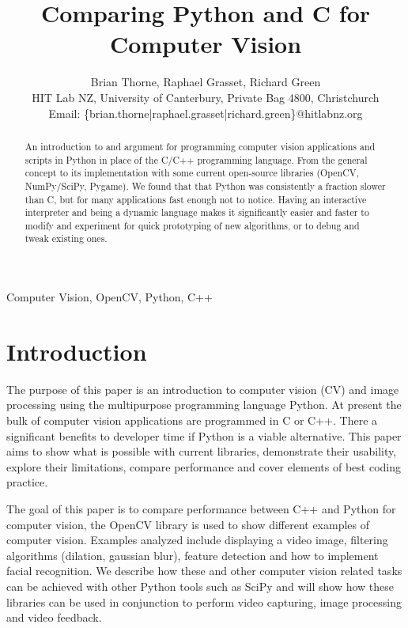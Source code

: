 \documentclass[english]{IEEEtran}
\theoremstyle{plain}
\begin{document}
\title{Comparing Python and C for Computer Vision}


\author{Brian Thorne, Raphael Grasset, Richard Green\\
HIT Lab NZ, University of Canterbury, Private Bag 4800, Christchurch\\
Email: \{brian.thorne|raphael.grasset|richard.green\}@hitlabnz.org}
\maketitle
\begin{abstract}
An introduction to and argument for programming computer vision applications
and scripts in Python in place of the C/C++ programming language.
From the general concept to its implementation with some current open-source
libraries (OpenCV, NumPy/SciPy, Pygame). We found that that Python
was consistently a fraction slower than C, but for many applications
fast enough not to notice. Having an interactive interpreter and being
a dynamic language makes it significantly easier and faster to modify
and experiment for quick prototyping of new algorithms, or to debug
and tweak existing ones.\end{abstract}
\begin{keywords}
Computer Vision, OpenCV, Python, C++
\end{keywords}

\section{Introduction}

The purpose of this paper is an introduction to computer vision (CV)
and image processing using the multipurpose programming language Python.
At present the bulk of computer vision applications are programmed
in C or C++. There a significant benefits to developer time if Python
is a viable alternative. This paper aims to show what is possible
with current libraries, demonstrate their usability, explore their
limitations, compare performance and cover elements of best coding
practice.

The goal of this paper is to compare performance between C++ and Python
for computer vision, the OpenCV library is used to show different
examples of computer vision. Examples analyzed include displaying
a video image, filtering algorithms (dilation, gaussian blur), feature
detection and how to implement facial recognition. We describe how
these and other computer vision related tasks can be achieved with
other Python tools such as SciPy\cite{oliphant2007python} and will
show how these libraries can be used in conjunction to perform video
capturing, image processing and video feedback.
\end{document}
